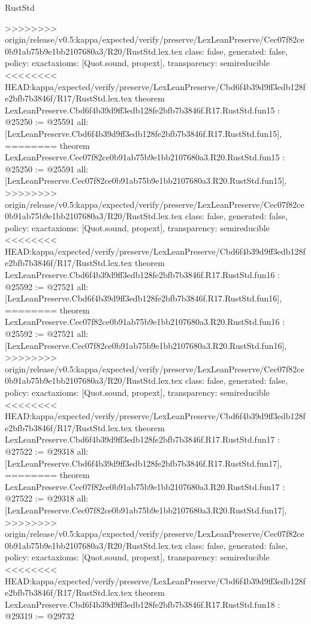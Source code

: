 \begin{lexlean}{RustStd}
\begin{coremodule}
{\begin{coremodule}
{{{{{{{{{{{{{{{{{{>>>>>>>> origin/release/v0.5:kappa/expected/verify/preserve/LexLeanPreserve/Cec07f82ce0b91ab75b9e1bb2107680a3/R20/RustStd.lex.tex
  class: false,
  generated: false,
  policy: exact{axioms: [Quot.sound, propext]},
  transparency: semireducible
}
<<<<<<<< HEAD:kappa/expected/verify/preserve/LexLeanPreserve/Cbd6f4b39d9ff3edb128fe2bfb7b3846f/R17/RustStd.lex.tex
theorem LexLeanPreserve.Cbd6f4b39d9ff3edb128fe2bfb7b3846f.R17.RustStd.fun15 : @25250 := @25591 {
  all: [LexLeanPreserve.Cbd6f4b39d9ff3edb128fe2bfb7b3846f.R17.RustStd.fun15],
========
theorem LexLeanPreserve.Cec07f82ce0b91ab75b9e1bb2107680a3.R20.RustStd.fun15 : @25250 := @25591 {
  all: [LexLeanPreserve.Cec07f82ce0b91ab75b9e1bb2107680a3.R20.RustStd.fun15],
>>>>>>>> origin/release/v0.5:kappa/expected/verify/preserve/LexLeanPreserve/Cec07f82ce0b91ab75b9e1bb2107680a3/R20/RustStd.lex.tex
  class: false,
  generated: false,
  policy: exact{axioms: [Quot.sound, propext]},
  transparency: semireducible
}
<<<<<<<< HEAD:kappa/expected/verify/preserve/LexLeanPreserve/Cbd6f4b39d9ff3edb128fe2bfb7b3846f/R17/RustStd.lex.tex
theorem LexLeanPreserve.Cbd6f4b39d9ff3edb128fe2bfb7b3846f.R17.RustStd.fun16 : @25592 := @27521 {
  all: [LexLeanPreserve.Cbd6f4b39d9ff3edb128fe2bfb7b3846f.R17.RustStd.fun16],
========
theorem LexLeanPreserve.Cec07f82ce0b91ab75b9e1bb2107680a3.R20.RustStd.fun16 : @25592 := @27521 {
  all: [LexLeanPreserve.Cec07f82ce0b91ab75b9e1bb2107680a3.R20.RustStd.fun16],
>>>>>>>> origin/release/v0.5:kappa/expected/verify/preserve/LexLeanPreserve/Cec07f82ce0b91ab75b9e1bb2107680a3/R20/RustStd.lex.tex
  class: false,
  generated: false,
  policy: exact{axioms: [Quot.sound, propext]},
  transparency: semireducible
}
<<<<<<<< HEAD:kappa/expected/verify/preserve/LexLeanPreserve/Cbd6f4b39d9ff3edb128fe2bfb7b3846f/R17/RustStd.lex.tex
theorem LexLeanPreserve.Cbd6f4b39d9ff3edb128fe2bfb7b3846f.R17.RustStd.fun17 : @27522 := @29318 {
  all: [LexLeanPreserve.Cbd6f4b39d9ff3edb128fe2bfb7b3846f.R17.RustStd.fun17],
========
theorem LexLeanPreserve.Cec07f82ce0b91ab75b9e1bb2107680a3.R20.RustStd.fun17 : @27522 := @29318 {
  all: [LexLeanPreserve.Cec07f82ce0b91ab75b9e1bb2107680a3.R20.RustStd.fun17],
>>>>>>>> origin/release/v0.5:kappa/expected/verify/preserve/LexLeanPreserve/Cec07f82ce0b91ab75b9e1bb2107680a3/R20/RustStd.lex.tex
  class: false,
  generated: false,
  policy: exact{axioms: [Quot.sound, propext]},
  transparency: semireducible
}
<<<<<<<< HEAD:kappa/expected/verify/preserve/LexLeanPreserve/Cbd6f4b39d9ff3edb128fe2bfb7b3846f/R17/RustStd.lex.tex
theorem LexLeanPreserve.Cbd6f4b39d9ff3edb128fe2bfb7b3846f.R17.RustStd.fun18 : @29319 := @29732 {
}}}}}}}}}}}}}}}}}}}}}
\end{coremodule}}
\end{coremodule}
\end{lexlean}
